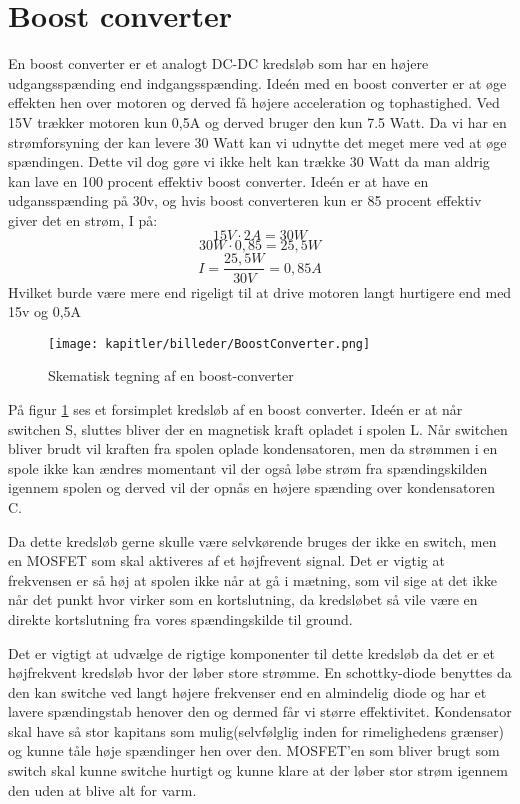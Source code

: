\newpage
\section{Boost converter}
En boost converter er et analogt DC-DC kredsløb som har en højere udgangsspænding end indgangsspænding.
Ideén med en boost converter er at øge effekten hen over motoren og derved få højere acceleration og tophastighed. Ved 15V trækker motoren kun 0,5A og derved bruger den kun 7.5 Watt. Da vi har en strømforsyning der kan levere 30 Watt kan vi udnytte det meget mere ved at øge spændingen. Dette vil dog gøre vi ikke helt kan trække 30 Watt da man aldrig kan lave en 100 procent effektiv boost converter.  Ideén er at have en udgansspænding på 30v, og hvis boost converteren kun er 85 procent effektiv giver det en strøm, I på:
\begin{equation}
15V \cdot 2A = 30 W
\end{equation}
\begin{equation}
30 W \cdot 0,85 = 25,5 W
\end{equation}
\begin{equation}
I = \frac{25,5 W}{30 V} = 0,85A
\end{equation}
Hvilket burde være mere end rigeligt til at drive motoren langt hurtigere end med 15v og 0,5A

\begin{figure}[ht]
    \centering
    \texttt{[image: kapitler/billeder/BoostConverter.png]}
    \caption{Skematisk tegning af en boost-converter}
    \label{fig:boostconvert}
\end{figure}

På figur \ref{fig:boostconvert} ses et forsimplet kredsløb af en boost converter. Ideén er at når switchen S, sluttes bliver der en magnetisk kraft opladet i spolen L. Når switchen bliver brudt vil kraften fra spolen oplade kondensatoren, men da strømmen i en spole ikke kan ændres momentant vil der også løbe strøm fra spændingskilden igennem spolen og derved vil der opnås en højere spænding over kondensatoren C.

Da dette kredsløb gerne skulle være selvkørende bruges der ikke en switch, men en MOSFET som skal aktiveres af et højfrevent signal. Det er vigtig at frekvensen er så høj at spolen ikke når at gå i mætning, som vil sige at det ikke når det punkt hvor virker som en kortslutning, da kredsløbet så vile være en direkte kortslutning fra vores spændingskilde til ground.

Det er vigtigt at udvælge de rigtige komponenter til dette kredsløb da det er et højfrekvent kredsløb hvor der løber store strømme. En schottky-diode benyttes da den kan switche ved langt højere frekvenser end en almindelig diode og har et lavere spændingstab henover den og dermed får vi større effektivitet. Kondensator skal have så stor kapitans som mulig(selvfølglig inden for rimelighedens grænser) og kunne tåle høje spændinger hen over den. MOSFET'en som bliver brugt som switch skal kunne switche hurtigt og kunne klare at der løber stor strøm igennem den uden at blive alt for varm.

